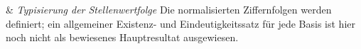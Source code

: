 \begin{BandUebersicht}
&
\textit{Typisierung der Stellenwertfolge}
Die normalisierten Ziffernfolgen werden definiert; ein allgemeiner
Existenz- und Eindeutigkeitssatz für jede Basis ist hier noch nicht
als bewiesenes Hauptresultat ausgewiesen.
\\
\end{BandUebersicht}
